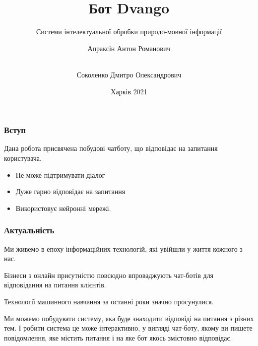 \documentclass{beamer}
\title{Бот Dvango}
\subtitle{Системи інтелектуальної обробки природо-мовної інформації}
\author[Апраксін, Соколенко]{
    Апраксін Антон Романович
    \and\\
    Соколенко Дмитро Олександрович
}
\institute[ХНУРЕ]{ІТШІ-18-1}
\date{Харків 2021}
\begin{document}
\frame{\titlepage}

\begin{frame}
    \frametitle{Вступ}
    Дана робота присвячена побудові чатботу, що відповідає на запитання користувача.

    \begin{itemize}
        \item Не може підтримувати діалог
        \item Дуже гарно відповідає на запитання
        \item Використовує нейронні мережі.
    \end{itemize}
    
\end{frame}

\begin{frame}
    \frametitle{Актуальність}
    Ми живемо в епоху інформаційних технологій, які увійшли у життя кожного з нас. 
    
    Бізнеси з онлайн присутністю повсюдно впроваджують чат-ботів для відповідання на питання клієнтів.
    
    Технології машинного навчання за останні роки значно просунулися.


    Ми можемо побудувати систему, яка буде знаходити відповіді на питання з різних тем. І робити система це може інтерактивно, у вигляді чат-боту, якому ви пишете повідомлення, яке містить питання і на яке бот якось змістовно відповідає.

\end{frame}
\end{document}
